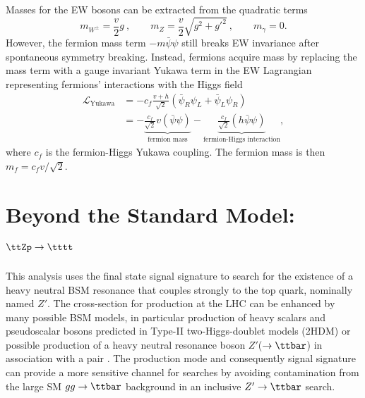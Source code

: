 \documentclass[../thesis.tex]{subfiles}
\begin{document}
Masses for the \acs{EW} bosons can be extracted from the quadratic terms
\begin{equation}
m_{W^\pm} = \frac{v}{2}g\:, \qquad m_Z = \frac{v}{2}\sqrt{g^2+g'^2}\:, \qquad m_\gamma = 0.
\end{equation}
However, the fermion mass term $-m\bar{\psi}\psi$ still breaks \acs{EW} invariance after spontaneous symmetry breaking. Instead, fermions acquire mass by replacing the mass term with a gauge invariant Yukawa term in the \acs{EW} Lagrangian representing fermions' interactions with the Higgs field \citep{theory:higgs_physics}
\begin{equation}
\begin{aligned}
\mathcal{L}_\text{Yukawa} 
&= -c_f\frac{v+h}{\sqrt{2}}\left(\bar{\psi}_R\psi_L+\bar{\psi}_L\psi_R\right) \\
&=
- \underbrace{\frac{c_f}{\sqrt{2}}v(\bar{\psi}\psi)}_\text{fermion mass}
- \underbrace{\frac{c_f}{\sqrt{2}}(h\bar{\psi}\psi)}_\text{fermion-Higgs interaction},
\end{aligned}
\end{equation}
where $c_f$ is the fermion-Higgs Yukawa coupling. The fermion mass is then $m_f = c_f v/\sqrt{2}$.

\section{Beyond the Standard Model: $\ttZp\rightarrow\tttt$}

This analysis uses the \tttt final state signal signature to search for the existence of a heavy neutral \acs{BSM} resonance that couples strongly to the top quark, nominally named $Z'$. The cross-section for \tttt production at the \acs{LHC} can be enhanced by many possible \acs{BSM} models, in particular production of heavy scalars and pseudoscalar bosons predicted in Type-II two-Higgs-doublet models (\acs{2HDM}) \citep{Craig:2015jba,Craig_2017,Branco:2011iw,PhysRevD.93.075038,higgscomp} or possible production of a heavy neutral resonance boson $Z'$($\rightarrow\ttbar$) in association with a \ttbar pair \citep{Ferretti:2013kya,Vecchi:2015fma}. The \ttZp production mode and consequently \tttt signal signature can provide a more sensitive channel for searches by avoiding contamination from the large \acs{SM} $gg\rightarrow \ttbar$ background in an inclusive $Z'\rightarrow\ttbar$ search.
\end{document}
